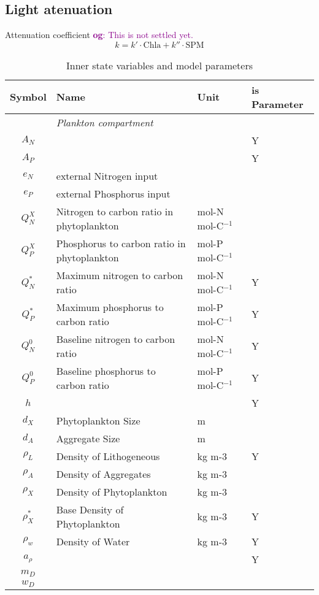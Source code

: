 \documentclass[fleqn]{article}                     %
\newcommand{\comment}[3][darkmagenta]{\textcolor{#1}{\textbf{#2}: #3}}
\begin{document}
\subsection{Light atenuation}
Attenuation coefficient
\comment{og}{This is not settled yet.}
\begin{equation}
  k = k'\cdot \textrm{Chla} + k'' \cdot \textrm{SPM}
\end{equation}

\begin{table*}[h]
  \centering
  \caption{Inner state variables and model parameters}
  \begin{tabular}{clll}
  \hline
    \textbf{Symbol} & \textbf{Name} & \textbf{Unit}& is Parameter \\ \hline
    & \emph{Plankton compartment} & \\
    $A_N$&&&Y\\
    $A_P$&&&Y\\
    $e_N$ & external Nitrogen input\\
    $e_P$ & external Phosphorus input \\
    $Q^X_N$ & Nitrogen to carbon ratio in phytoplankton & mol-N mol-C$^{-1}$ \\
    $Q^X_P$ & Phosphorus to carbon ratio in phytoplankton & mol-P mol-C$^{-1}$ \\
    $Q^*_N$ & Maximum nitrogen to carbon ratio & mol-N mol-C$^{-1}$ &Y\\
    $Q^*_P$ & Maximum phosphorus to carbon ratio & mol-P mol-C$^{-1}$ &Y\\
    $Q^0_N$ & Baseline nitrogen to carbon ratio & mol-N mol-C$^{-1}$ &Y\\
    $Q^0_P$ & Baseline phosphorus to carbon ratio & mol-P mol-C$^{-1}$ &Y\\
    $h$ & &&Y\\
    $d_X$&Phytoplankton Size& m &\\
    $d_A$&Aggregate Size& m &\\
    $\rho_L$& Density of Lithogeneous & kg m-3 & Y\\
    $\rho_A$& Density of Aggregates & kg m-3&\\
    $\rho_X$& Density of Phytoplankton & kg m-3 &\\
     $\rho^*_X$& Base Density of Phytoplankton & kg m-3 &Y\\
    $\rho_w$&Density of Water & kg m-3&Y\\
    $a_\rho$&&&Y\\
    $m_D$&\\
    $w_D$&\\

\end{tabular}
\end{table*}
\end{document}
